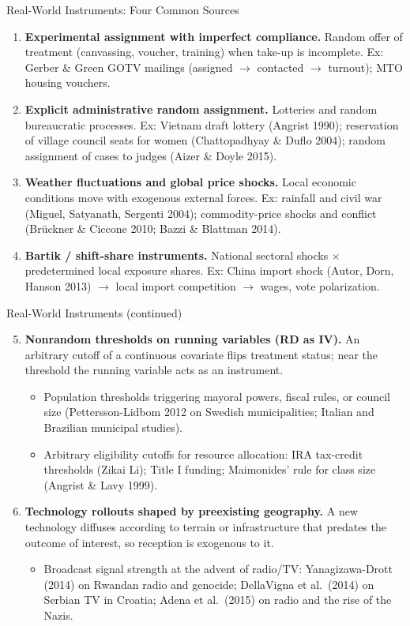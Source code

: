 \documentclass[aspectratio=169, handout]{beamer}
\numberwithin{equation}{section}
\begin{document}
\begin{frame}{Real-World Instruments: Four Common Sources}
\begin{enumerate}
\item \textbf{Experimental assignment with imperfect compliance.} Random offer of treatment (canvassing, voucher, training) when take-up is incomplete. Ex: Gerber \& Green GOTV mailings (assigned $\to$ contacted $\to$ turnout); MTO housing vouchers.
\item \textbf{Explicit administrative random assignment.} Lotteries and random bureaucratic processes. Ex: Vietnam draft lottery (Angrist 1990); reservation of village council seats for women (Chattopadhyay \& Duflo 2004); random assignment of cases to judges (Aizer \& Doyle 2015).
\item \textbf{Weather fluctuations and global price shocks.} Local economic conditions move with exogenous external forces. Ex: rainfall and civil war (Miguel, Satyanath, Sergenti 2004); commodity-price shocks and conflict (Brückner \& Ciccone 2010; Bazzi \& Blattman 2014).
\item \textbf{Bartik / shift-share instruments.} National sectoral shocks $\times$ predetermined local exposure shares. Ex: China import shock (Autor, Dorn, Hanson 2013) $\to$ local import competition $\to$ wages, vote polarization.
\end{enumerate}
\end{frame}


\begin{frame}{Real-World Instruments (continued)}
\begin{enumerate}\setcounter{enumi}{4}
\item \textbf{Nonrandom thresholds on running variables (RD as IV).} An arbitrary cutoff of a continuous covariate flips treatment status; near the threshold the running variable acts as an instrument.
\begin{itemize}
\item Population thresholds triggering mayoral powers, fiscal rules, or council size (Pettersson-Lidbom 2012 on Swedish municipalities; Italian and Brazilian municipal studies).
\item Arbitrary eligibility cutoffs for resource allocation: IRA tax-credit thresholds (Zikai Li); Title I funding; Maimonides' rule for class size (Angrist \& Lavy 1999).
\end{itemize}
\item \textbf{Technology rollouts shaped by preexisting geography.} A new technology diffuses according to terrain or infrastructure that predates the outcome of interest, so reception is exogenous to it.
\begin{itemize}
\item Broadcast signal strength at the advent of radio/TV: Yanagizawa-Drott (2014) on Rwandan radio and genocide; DellaVigna et al.\ (2014) on Serbian TV in Croatia; Adena et al.\ (2015) on radio and the rise of the Nazis.
\end{itemize}
\end{enumerate}
\end{frame}
\end{document}
